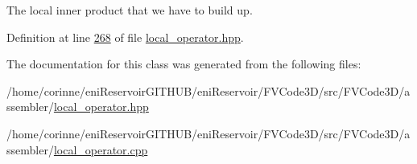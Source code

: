The local inner product that we have to build up. 



Definition at line \hyperlink{local__operator_8hpp_source_l00268}{268} of file \hyperlink{local__operator_8hpp_source}{local\+\_\+operator.\+hpp}.



The documentation for this class was generated from the following files\+:\begin{DoxyCompactItemize}
\item 
/home/corinne/eni\+Reservoir\+G\+I\+T\+H\+U\+B/eni\+Reservoir/\+F\+V\+Code3\+D/src/\+F\+V\+Code3\+D/assembler/\hyperlink{local__operator_8hpp}{local\+\_\+operator.\+hpp}\item 
/home/corinne/eni\+Reservoir\+G\+I\+T\+H\+U\+B/eni\+Reservoir/\+F\+V\+Code3\+D/src/\+F\+V\+Code3\+D/assembler/\hyperlink{local__operator_8cpp}{local\+\_\+operator.\+cpp}\end{DoxyCompactItemize}

